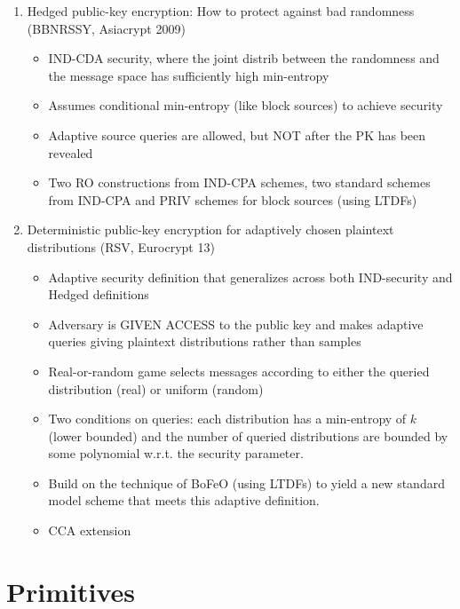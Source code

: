\documentclass[11pt, pdftex]{article}
\begin{document}
\begin{enumerate}
\item Hedged public-key encryption: How to protect against bad randomness (BBNRSSY, Asiacrypt 2009)
\begin{itemize}
\item IND-CDA security, where the joint distrib between the randomness and the message space has sufficiently high min-entropy
\item Assumes conditional min-entropy (like block sources) to achieve security
\item Adaptive source queries are allowed, but NOT after the PK has been revealed
\item Two RO constructions from IND-CPA schemes, two standard schemes from IND-CPA and PRIV schemes for block sources (using LTDFs)
\end{itemize}

\item Deterministic public-key encryption for adaptively chosen plaintext distributions (RSV, Eurocrypt 13)
\begin{itemize}
\item Adaptive security definition that generalizes across both IND-security and Hedged definitions
\item Adversary is GIVEN ACCESS to the public key and makes adaptive queries giving plaintext distributions rather than samples
\item Real-or-random game selects messages according to either the queried distribution (real) or uniform (random)
\item Two conditions on queries: each distribution has a min-entropy of $k$ (lower bounded) and the number of queried distributions are bounded by some polynomial w.r.t. the security parameter.
\item Build on the technique of BoFeO (using LTDFs) to yield a new standard model scheme that meets this adaptive definition.
\item CCA extension
\end{itemize}
\end{enumerate}

\section{Primitives}
\end{document}
